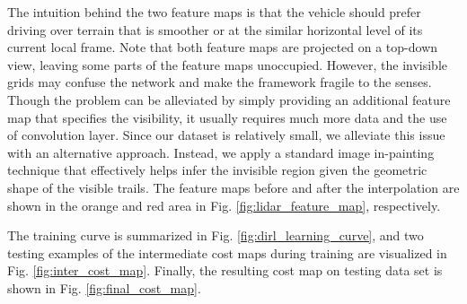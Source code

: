 \documentclass[../thesis.tex]{subfiles}
\begin{document}
 
The intuition behind the two feature maps is that the vehicle should prefer driving over terrain that is smoother or at the similar horizontal level of its current local frame.
Note that both feature maps are projected on a top-down view, leaving some parts of the feature maps unoccupied.
However, the invisible grids may confuse the network and make the framework fragile to the senses.
Though the problem can be alleviated by simply providing an additional feature map that specifies the visibility, it usually requires much more data and the use of convolution layer. \cite{wulfmeier2015maximum,wulfmeier2016watch}
Since our dataset is relatively small, we alleviate this issue with an alternative approach.
Instead, we apply a standard image in-painting technique \cite{telea2004image} that effectively helps infer the invisible region given the geometric shape of the visible trails.
The feature maps before and after the interpolation are shown in the orange and red area in Fig. \ref{fig:lidar_feature_map}, respectively.
 
The training curve is summarized in Fig. \ref{fig:dirl_learning_curve}, and two testing examples of the intermediate cost maps during training are visualized in Fig. \ref{fig:inter_cost_map}. Finally, the resulting cost map on testing data set is shown in Fig. \ref{fig:final_cost_map}.
 
\end{document}
